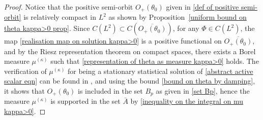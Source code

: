 \documentclass[reqno]{amsart}%
\theoremstyle{definition}
\theoremstyle{remark}
\numberwithin{equation}{section}
\newcommand{\1}{\mathbf{1}}
\numberwithin{equation}{section}
\numberwithin{theorem}{section}
\numberwithin{figure}{section}
\begin{document}
\begin{proof}
Notice that the positive semi-orbit $O_{+}(\theta_0)$ given in \eqref{def of positive semi-orbit} is relatively compact in $L^2$ as shown by Proposition~\ref{uniform bound on theta kappa>0 prop}. Since $C(L^2)\subset C(\overline{O_{+}(\theta_0)})$, for any $\Phi\in C(L^2)$, the map \eqref{realisation map on solution kappa>0} is a positive functional on $\overline{O_{+}(\theta_0)}$, and by the Riesz representation theorem on compact spaces, there exists a Borel measure $\mu^{(\kappa)}$ such that \eqref{representation of theta as measure kappa>0} holds. The verification of $\mu^{(\kappa)}$ for being a stationary statistical solution of \eqref{abstract active scalar eqn} can be found in \cite{CTV14b}, and using the bound \eqref{bound on theta by damping}, it shows that $O_{+}(\theta_0)$ is included in the set $B_p$ as given in \eqref{set Bp}, hence the measure $\mu^{(\kappa)}$ is supported in the set $\bar{A}$ by \eqref{inequality on the integral on mu kappa>0}.


\end{proof}
\end{document}
